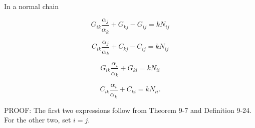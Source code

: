 In a normal chain

$$G_{ik} \frac{\alpha_j}{\alpha_k} + G_{kj} - G_{ij} = kN_{ij}$$

$$C_{ik} \frac{\alpha_j}{\alpha_k} + C_{kj} - C_{ij} = kN_{ij}$$

$$G_{ik} \frac{\alpha_i}{\alpha_k} + G_{ki} = kN_{ii}$$

$$C_{ik} \frac{\alpha_i}{\alpha_k} + C_{ki} = kN_{ii}.$$

PROOF: The first two expressions follow from Theorem 9-7 and Definition 9-24. For the other two, set $i = j$.
